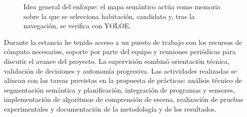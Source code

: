 \documentclass[11pt,fleqn,openany]{book} %
\begin{document}
\begin{figure}[H]
\centering
{}
\caption[Idea general del enfoque propuesto.]{Idea general del enfoque: el mapa semántico actúa como memoria sobre la que se selecciona habitación, candidato y, tras la navegación, se verifica con YOLOE.}
\label{fig:arquitectura_general}
\end{figure}

Durante la estancia he tenido acceso a un puesto de trabajo con los recursos de cómputo necesarios, soporte por parte del equipo y reuniones periódicas para discutir el avance del proyecto. La supervisión combinó orientación técnica, validación de decisiones y autonomía progresiva. Las actividades realizadas se alinean con las tareas previstas en la propuesta de prácticas: análisis técnico de segmentación semántica y planificación, integración de programas y sensores, implementación de algoritmos de comprensión de escena, realización de pruebas experimentales y documentación de la metodología y de los resultados.
\end{document}
